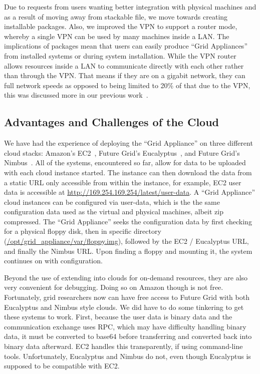 \documentclass[conference]{IEEEtran}
\begin{document}
Due to requests from users wanting better integration with physical machines
and as a result of moving away from stackable file, we move towards creating
installable packages.  Also, we improved the VPN to support a router mode,
whereby a single VPN can be used by many machines inside a LAN.  The
implications of packages mean that users can easily produce ``Grid Appliances''
from installed systems or during system installation.  While the VPN router
allows resources inside a LAN to communicate directly with each other rather
than through the VPN.  That means if they are on a gigabit network, they can
full network speeds as opposed to being limited to 20\% of that due to the VPN,
this was discussed more in our previous work~\cite{sc09}.

\subsection{Advantages and Challenges of the Cloud}

We have had the experience of deploying the ``Grid Appliance'' on three
different cloud stacks:  Amazon's EC2~\cite{ec2}, Future Grid's
Eucalyptus~\cite{eucalyptus}, and Future Grid's Nimbus~\cite{nimbus}.  All of
the systems, encountered so far, allow for data to be uploaded with each cloud
instance started.  The instance can then download the data from a static URL
only accessible from within the instance, for example, EC2 user data is
accessible at \url{http://169.254.169.254/latest/user-data}. A ``Grid
Appliance'' cloud instances can be configured via user-data, which is the the
same configuration data used as the virtual and physical machines, albeit zip
compressed.  The ``Grid Appliance'' seeks the configuration data by first
checking for a physical floppy disk, then in specific directory
(\url{/opt/grid\_appliance/var/floppy.img}), followed by the EC2 / Eucalyptus
URL, and finally the Nimbus URL.  Upon finding a floppy and mounting it, the
system continues on with configuration.

Beyond the use of extending into clouds for on-demand resources, they are also
very convenient for debugging.  Doing so on Amazon though is not free.
Fortunately, grid researchers now can have free access to Future Grid with both
Eucalyptus and Nimbus style clouds.  We did have to do some tinkering to get
these systems to work.  First, because the user data is binary data and the
communication exchange uses RPC, which may have difficulty handling binary
data, it must be converted to base64 before transferring and converted back
into binary data afterward.  EC2 handles this transparently, if using
command-line tools.  Unfortunately, Eucalyptus and Nimbus do not, even though
Eucalyptus is supposed to be compatible with EC2.
\end{document}
